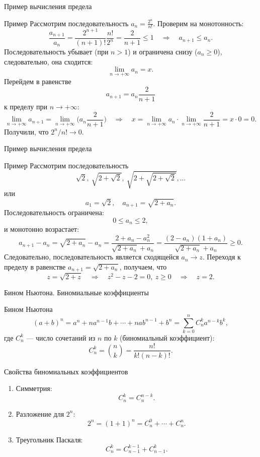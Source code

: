 \documentclass[8pt]{beamer}
\begin{document}
\begin{frame}{Пример вычисления предела}
\begin{block}{Пример}
Рассмотрим последовательность $\displaystyle a_n=\frac{2^n}{n!}$.
Проверим на монотонность:
$$\frac{a_{n+1}}{a_n}=\frac{ 2^{n+1}}{(n+1)!}\frac{n!}{2^n}=\frac{2}{n+1}\le1
\quad \Rightarrow \quad
a_{n+1}\le a_n.$$
Последовательность убывает (при $n>1$) и ограничена снизу ($a_n\ge 0$), следовательно, она сходится:
$$\lim_{n\to+\infty}a_n=x.$$
Перейдем в равенстве
$$a_{n+1} = a_n \frac{2}{n+1}$$
к пределу при $n\to+\infty$:
$$\lim_{n\to+\infty} a_{n+1} = \lim_{n\to+\infty}\Big(  a_n \frac{2}{n+1} \Big)
\quad \Rightarrow \quad
x = \lim_{n\to+\infty}a_n \cdot \lim_{n\to+\infty}\frac{2}{n+1} = x \cdot 0=0.$$
Получили, что $2^n/n! \to 0$.
\end{block}
\end{frame}

\begin{frame}{Пример вычисления предела}
\begin{block}{Пример}
Рассмотрим последовательность
$$\sqrt{2},\ \sqrt{2+\sqrt{2}},\ \sqrt{2+\sqrt{2+\sqrt{2}}},\ldots$$
или
$$a_1=\sqrt{2},\quad a_{n+1}=\sqrt{2+a_n}.$$
Последовательность ограничена:
$$0\le a_n \le 2,$$
и монотонно возрастает:
$$a_{n+1} - a_n = \sqrt{2+a_n} - a_n = \frac{2+a_n-a_n^2}{\sqrt{2+a_n} + a_n }=
\frac{(2-a_n)(1+a_n)}{\sqrt{2+a_n} + a_n }\ge 0.
$$
Следовательно, последовательность является сходящейся $a_n\to z$. Переходя к пределу в равенстве $ a_{n+1}=\sqrt{2+a_n}$, получаем, что
$$z=\sqrt{2+z} \quad \Rightarrow \quad z^2-z-2=0,\ z\ge0 \quad\Rightarrow\quad z=2.$$

\end{block}
\end{frame}

\begin{frame}{Бином Ньютона. Биномиальные коэффициенты}
\begin{block}{Бином Ньютона}
$$(a+b)^n = a^n + n a^{n-1} b + \cdots + n a b^{n-1} + b^n = 
\sum_{k=0}^n C_n^k a^{n-k} b^k,$$
где $C_n^k$ --- число сочетаний из $n$ по $k$ (биномиальный коэффициент):
$$C_n^k = \binom{n}{k} = \frac{n!}{k! (n-k)!}.$$ 
\end{block}
\begin{block}{Свойства биномиальных коэффициентов}
\begin{enumerate}
\item Симметрия:
$$C_n^k = C_n^{n-k}.$$
\item Разложение для $2^n$:
$$2^n = (1+1)^n = C_n^0+ \cdots + C_n^n.$$
\item Треугольник Паскаля:
$$C_n^k = C_{n-1}^{k-1} + C_{n-1}^k.$$
\end{enumerate}
\end{block}
\end{frame}
\end{document}
